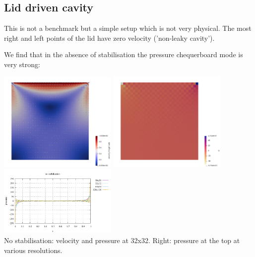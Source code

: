 \newpage
\subsection*{Lid driven cavity}

This is not a benchmark but a simple setup which is not very physical. The most right and left
points of the lid have zero velocity ('non-leaky cavity').

We find that in the absence of stabilisation the pressure chequerboard mode is 
very strong:
\begin{center}
\includegraphics[width=5.7cm]{python_codes/fieldstone_115/results/ldc/nostab/vel}
\includegraphics[width=5.7cm]{python_codes/fieldstone_115/results/ldc/nostab/p}
\includegraphics[width=5.7cm]{python_codes/fieldstone_115/results/ldc/psurf_nostab.pdf}\\
{\captionfont No stabilisation: velocity and pressure at 32x32. Right: 
pressure at the top at various resolutions.}
\end{center}

